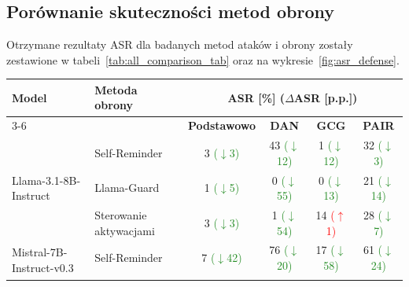 \subsection{Porównanie skuteczności metod obrony}
Otrzymane rezultaty \gls{ASR} dla badanych metod ataków i obrony zostały zestawione w tabeli~\ref{tab:all_comparison_tab} oraz na wykresie~\ref{fig:asr_defense}.
\begin{table}[!ht]
    \centering
    \renewcommand{\arraystretch}{1.2}
    \begin{tabular}{l|l|c|c|c|c}
        \hline
        \multirow{2}{*}{\textbf{Model}} & \multirow{2}{*}{\textbf{Metoda obrony}} & \multicolumn{4}{c}{\textbf{ASR [\%] ($\Delta$ASR [p.p.])}}                                                                                                                                                                               \\\cline{3-6}
                                        &                                         & \textbf{Podstawowo}                                        & \textbf{DAN}                                            & \textbf{GCG}                                            & \textbf{PAIR}                                           \\\hline
        \multirow{3}{*}{Llama-3.1-8B-Instruct}
                                        & Self-Reminder                           & 3 \textcolor{ForestGreen}{\scriptsize($\downarrow$3)}      & 43 \textcolor{ForestGreen}{\scriptsize($\downarrow$12)} & 1 \textcolor{ForestGreen}{\scriptsize($\downarrow$12)}  & 32 \textcolor{ForestGreen}{\scriptsize($\downarrow$3)}  \\\cline{2-6}
                                        & Llama-Guard                             & 1 \textcolor{ForestGreen}{\scriptsize($\downarrow$5)}      & 0 \textcolor{ForestGreen}{\scriptsize($\downarrow$55)}  & 0 \textcolor{ForestGreen}{\scriptsize($\downarrow$13)}  & 21 \textcolor{ForestGreen}{\scriptsize($\downarrow$14)} \\\cline{2-6}
                                        & Sterowanie aktywacjami                  & 3 \textcolor{ForestGreen}{\scriptsize($\downarrow$3)}      & 1 \textcolor{ForestGreen}{\scriptsize($\downarrow$54)}  & 14 \textcolor{Red}{\scriptsize($\uparrow$1)}            & 28 \textcolor{ForestGreen}{\scriptsize($\downarrow$7)}  \\\hline
        \multirow{3}{*}{Mistral-7B-Instruct-v0.3}
                                        & Self-Reminder                           & 7 \textcolor{ForestGreen}{\scriptsize($\downarrow$42)}     & 76 \textcolor{ForestGreen}{\scriptsize($\downarrow$20)} & 17 \textcolor{ForestGreen}{\scriptsize($\downarrow$58)} & 61 \textcolor{ForestGreen}{\scriptsize($\downarrow$24)} \\\cline{2-6}

\end{tabular}
\end{table}
